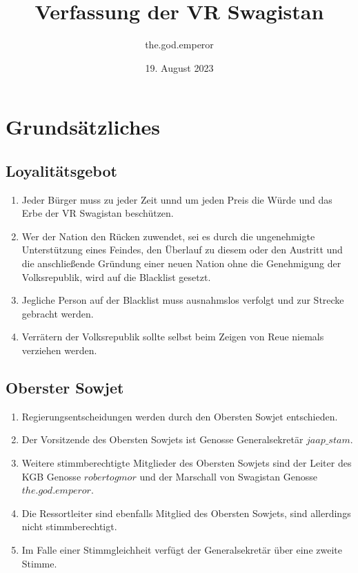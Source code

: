 \documentclass{article}
\title{Verfassung der VR Swagistan}
\author{the.god.emperor}
\date{19. August 2023}
\begin{document}
\maketitle
\newpage
\tableofcontents
\newpage


\section{Grundsätzliches}
\subsection{Loyalitätsgebot}
\begin{enumerate}[(1)]
    \item Jeder Bürger muss zu jeder Zeit unnd um jeden Preis die Würde und das Erbe der VR Swagistan beschützen.
    \item Wer der Nation den Rücken zuwendet, sei es durch die ungenehmigte Unterstützung eines Feindes, den Überlauf zu diesem oder den Austritt und die anschließende Gründung einer neuen Nation ohne die Genehmigung der Volksrepublik, wird auf die Blacklist gesetzt.
    \item Jegliche Person auf der Blacklist muss ausnahmslos verfolgt und zur Strecke gebracht werden.
    \item Verrätern der Volksrepublik sollte selbst beim Zeigen von Reue niemals verziehen werden.
\end{enumerate}

\subsection{Oberster Sowjet}
\begin{enumerate}[(1)]
    \item Regierungsentscheidungen werden durch den Obersten Sowjet entschieden.
    \item Der Vorsitzende des Obersten Sowjets ist Genosse Generalsekretär $jaap\_stam$.
    \item Weitere stimmberechtigte Mitglieder des Obersten Sowjets sind der Leiter des KGB Genosse $robertogmor$ und der Marschall von Swagistan Genosse $the.god.emperor$.
    \item Die Ressortleiter sind ebenfalls Mitglied des Obersten Sowjets, sind allerdings nicht stimmberechtigt.
    \item Im Falle einer Stimmgleichheit verfügt der Generalsekretär über eine zweite Stimme.
\end{enumerate}
\end{document}
